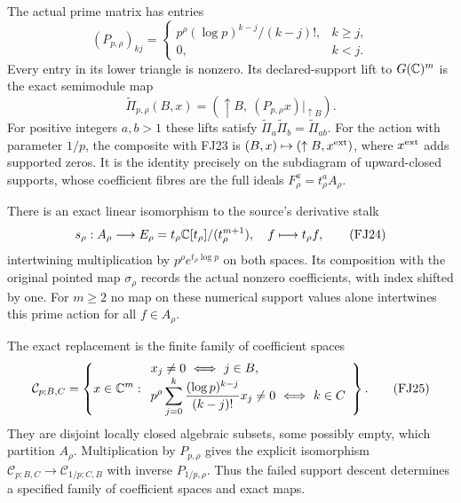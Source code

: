 \begin{theorem}
\label{fj:thm:prime-support}
The actual prime matrix has entries
\[
 (P_{p,\rho})_{kj}=
 \begin{cases}p^\rho(\log p)^{k-j}/(k-j)!,&k\ge j,\\0,&k<j.
 \end{cases}
 \tag{FJ22}\label{fj:fj:prime-matrix}
\]
Every entry in its lower triangle is nonzero. Its declared-support
lift to $G(\mathbb C)^m$ is the exact semimodule map
\[
 \widetilde\Pi_{p,\rho}(B,x)
   =(\uparrow B,\ (P_{p,\rho}x)|_{\uparrow B}).
 \tag{FJ23}\label{fj:fj:supported-prime}
\]
For positive integers $a,b>1$ these lifts satisfy
$\widetilde\Pi_a\widetilde\Pi_b=\widetilde\Pi_{ab}$.
For the action with parameter $1/p$, the composite with FJ23 is
$(B,x)\mapsto(\uparrow B,x^{\rm ext})$, where $x^{\rm ext}$ adds
supported zeros. It is the identity precisely on the subdiagram of
upward-closed supports, whose coefficient fibres are the full ideals
$F^a_\rho=t_\rho^aA_\rho$.

There is an exact linear isomorphism to the source's derivative stalk
\[
 s_\rho:A_\rho\longrightarrow E_\rho=t_\rho\mathbb C[t_\rho]/(t_\rho^{m+1}),
       \quad f\longmapsto t_\rho f,
 \tag{FJ24}
\]
intertwining multiplication by $p^\rho e^{t_\rho\log p}$ on both
spaces. Its composition with the original pointed map $\sigma_\rho$
records the actual nonzero coefficients, with index shifted by one.
For $m\ge2$ no map on these numerical support values alone
intertwines this prime action for all $f\in A_\rho$.

The exact replacement is the finite family of coefficient spaces
\[
 \mathcal C_{p;B,C}=\left\{x\in\mathbb C^m:
 \begin{array}{ll}
 x_j\ne0\ \Longleftrightarrow\ j\in B,\\
 \displaystyle p^\rho\sum_{j=0}^k
     \frac{(\log p)^{k-j}}{(k-j)!}x_j\ne0
       \ \Longleftrightarrow\ k\in C
 \end{array}\right\}.
 \tag{FJ25}\label{fj:fj:cells}
\]
They are disjoint locally closed algebraic subsets, some possibly
empty, which partition $A_\rho$. Multiplication by $P_{p,\rho}$
gives the explicit isomorphism
$\mathcal C_{p;B,C}\to\mathcal C_{1/p;C,B}$ with inverse
$P_{1/p,\rho}$. Thus the failed support descent determines a
specified family of coefficient spaces and exact maps.
\end{theorem}
